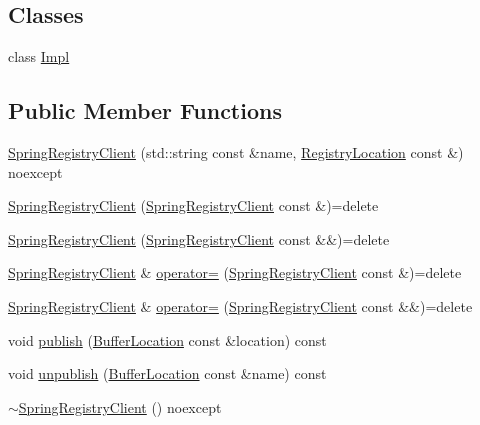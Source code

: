 \subsection*{Classes}
\begin{DoxyCompactItemize}
\item 
class \hyperlink{classregistry_1_1SpringRegistryClient_1_1Impl}{Impl}
\end{DoxyCompactItemize}
\subsection*{Public Member Functions}
\begin{DoxyCompactItemize}
\item 
\hyperlink{classregistry_1_1SpringRegistryClient_a891cfee599ee0ab6bd9239539a12f885}{Spring\+Registry\+Client} (std\+::string const \&name, \hyperlink{structregistry_1_1RegistryLocation}{Registry\+Location} const \&) noexcept
\item 
\hyperlink{classregistry_1_1SpringRegistryClient_a4328bd847a966b488d765dfb4a7836b9}{Spring\+Registry\+Client} (\hyperlink{classregistry_1_1SpringRegistryClient}{Spring\+Registry\+Client} const \&)=delete
\item 
\hyperlink{classregistry_1_1SpringRegistryClient_ae8b83d3c6f6225205c059ea7ec20d721}{Spring\+Registry\+Client} (\hyperlink{classregistry_1_1SpringRegistryClient}{Spring\+Registry\+Client} const \&\&)=delete
\item 
\hyperlink{classregistry_1_1SpringRegistryClient}{Spring\+Registry\+Client} \& \hyperlink{classregistry_1_1SpringRegistryClient_a7e1ae35762aee96920b92d2ef3000809}{operator=} (\hyperlink{classregistry_1_1SpringRegistryClient}{Spring\+Registry\+Client} const \&)=delete
\item 
\hyperlink{classregistry_1_1SpringRegistryClient}{Spring\+Registry\+Client} \& \hyperlink{classregistry_1_1SpringRegistryClient_aae8253a337694bc64f268bea5e277348}{operator=} (\hyperlink{classregistry_1_1SpringRegistryClient}{Spring\+Registry\+Client} const \&\&)=delete
\item 
void \hyperlink{classregistry_1_1SpringRegistryClient_a71cc90ee70c0f1de453ab39200bae41a}{publish} (\hyperlink{structregistry_1_1BufferLocation}{Buffer\+Location} const \&location) const
\item 
void \hyperlink{classregistry_1_1SpringRegistryClient_ab145f994204bb50543e24fd379ae6a21}{unpublish} (\hyperlink{structregistry_1_1BufferLocation}{Buffer\+Location} const \&name) const
\item 
\hyperlink{classregistry_1_1SpringRegistryClient_a4289550a022eee1ba06b32fdb529e9d1}{$\sim$\+Spring\+Registry\+Client} () noexcept
\end{DoxyCompactItemize}
